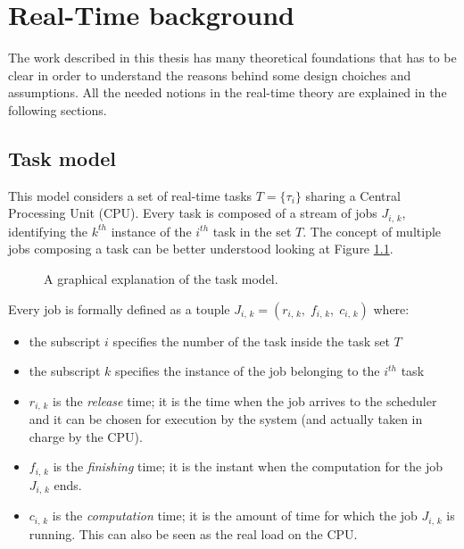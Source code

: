 \chapter{Real-Time background} \label{cha:rt_background}

The work described in this thesis has many theoretical foundations that has to be
clear in order to understand the reasons behind some design choiches and assumptions. 
All the needed notions in the real-time theory are explained in the following sections.


\section{Task model} \label{sec:task_model}
This model considers a set of real-time tasks \( T = \{\tau_{i}\} \)
sharing a Central Processing Unit (CPU). Every task
is composed of a stream of jobs \( J_{i,\,k} \), identifying the \( k^{th} \)
instance of the \( i^{th} \) task in the set \( T \). The concept of multiple
jobs composing a task can be better understood looking at Figure \ref{img:task_model}.
\begin{figure}[!htb]\label{img:task_model}
    \caption{A graphical explanation of the task model.}
\end{figure}

Every job is formally defined as a touple
\( J_{i,\,k} = \left(r_{i,\,k}, \;f_{i,\,k}, \;c_{i,\,k}\right) \) where:
\begin{itemize}
    \item the subscript \( i \) specifies the number of the task inside the task 
        set \( T \)
    \item the subscript \( k \) specifies the instance of the job belonging to
        the \( i^{th} \) task
    \item \( r_{i,\,k} \) is the \emph{release} time; it is the time when
        the job arrives to the scheduler and it can be chosen for execution
        by the system (and actually taken in charge by the CPU).
    \item \( f_{i,\,k} \) is the \emph{finishing} time; it is the instant when
        the computation for the job \( J_{i,\,k} \) ends.
    \item \( c_{i,\,k} \) is the \emph{computation} time; it is the amount of
        time for which the job \( J_{i,\,k} \) is running. This can also be seen
        as the real load on the CPU.
\end{itemize} 

